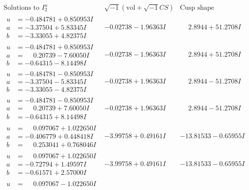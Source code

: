\documentclass[1p]{elsarticle_modified}
\theoremstyle{definition}
\newcommand{\I}{\sqrt{-1}}
\begin{document}
$$\begin{array}{c|c|c}  
\text{Solutions to }I^u_{2}& \I (\text{vol} + \sqrt{-1}CS) & \text{Cusp shape}\\
 \hline 
\begin{aligned}
u &= -0.484781 + 0.850953 I \\
a &= -3.37504 + 5.83345 I \\
b &= -3.33055 + 4.82375 I\end{aligned}
 & -0.02738 - 1.96363 I & \phantom{-}2.8944 + 51.2708 I \\ \hline\begin{aligned}
u &= -0.484781 + 0.850953 I \\
a &= \phantom{-}0.20739 - 7.60050 I \\
b &= -0.64315 - 8.14498 I\end{aligned}
 & -0.02738 - 1.96363 I & \phantom{-}2.8944 + 51.2708 I \\ \hline\begin{aligned}
u &= -0.484781 - 0.850953 I \\
a &= -3.37504 - 5.83345 I \\
b &= -3.33055 - 4.82375 I\end{aligned}
 & -0.02738 + 1.96363 I & \phantom{-}2.8944 - 51.2708 I \\ \hline\begin{aligned}
u &= -0.484781 - 0.850953 I \\
a &= \phantom{-}0.20739 + 7.60050 I \\
b &= -0.64315 + 8.14498 I\end{aligned}
 & -0.02738 + 1.96363 I & \phantom{-}2.8944 - 51.2708 I \\ \hline\begin{aligned}
u &= \phantom{-}0.097067 + 1.022650 I \\
a &= -0.406779 + 0.448418 I \\
b &= \phantom{-}0.253041 + 0.768046 I\end{aligned}
 & -3.99758 + 0.49161 I & -13.81533 - 0.65955 I \\ \hline\begin{aligned}
u &= \phantom{-}0.097067 + 1.022650 I \\
a &= -0.72794 + 1.49597 I \\
b &= -0.61571 + 2.57000 I\end{aligned}
 & -3.99758 + 0.49161 I & -13.81533 - 0.65955 I \\ \hline\begin{aligned}
u &= \phantom{-}0.097067 - 1.022650 I \\

\end{aligned}
\end{array}$$
\end{document}
